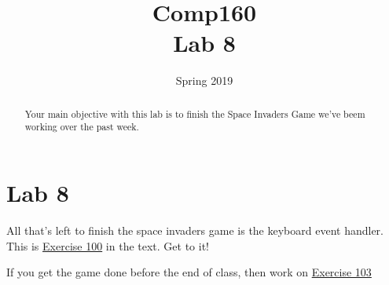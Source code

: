 \documentclass[nobib]{tufte-handout}
\title{Comp160 \\ Lab 8 }
\author{}
\date{ Spring 2019 }
\begin{document}
\maketitle

\begin{abstract}
Your main objective with this lab is to finish the Space Invaders Game we've beem
working over the past week.
\end{abstract}

\section*{Lab 8}

All that's left to finish the space invaders game is the keyboard event handler.
This is \href{https://htdp.org/2019-02-24/part_one.html#%28counter._mix._%28exercise._mix-ufo-fire%29%29}{Exercise 100} in the text.  Get to it!

If you get the game done before the end of class, then work on \href{https://htdp.org/2019-02-24/part_one.html#%28counter._mix._%28exercise._mix-zoo%29%29}{Exercise 103}
\end{document}
